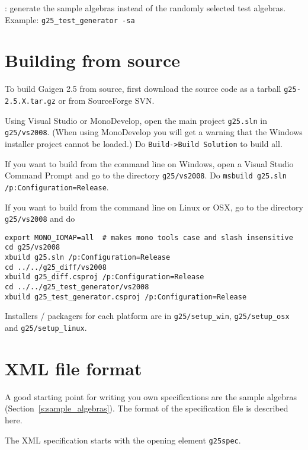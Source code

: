 \documentclass[10pt, a4paper]{article}
\begin{document}
\vspace*{2mm}

: generate the sample algebras instead of the randomly
selected test algebras.
Example: {\tt g25\_test\_generator -sa}

\section{Building from source}

To build Gaigen 2.5 from source, first download the source code as a tarball {\tt g25-2.5.X.tar.gz}
or from SourceForge SVN.

Using Visual Studio or MonoDevelop, open the main project {\tt g25.sln} in {\tt g25/vs2008}.
(When using MonoDevelop you will get a warning that the Windows installer project cannot be loaded.)
Do {\tt Build->Build Solution} to build all. 

If you want to build from the command line on Windows, open a Visual Studio Command Prompt and
go to the directory {\tt g25/vs2008}. Do {\tt msbuild g25.sln /p:Configuration=Release}.

If you want to build from the command line on Linux or OSX, go to the directory {\tt g25/vs2008}
and do 
\begin{verbatim}
export MONO_IOMAP=all  # makes mono tools case and slash insensitive
cd g25/vs2008
xbuild g25.sln /p:Configuration=Release
cd ../../g25_diff/vs2008
xbuild g25_diff.csproj /p:Configuration=Release
cd ../../g25_test_generator/vs2008
xbuild g25_test_generator.csproj /p:Configuration=Release
\end{verbatim}

Installers / packagers for each platform are in {\tt g25/setup\_win}, 
{\tt g25/setup\_osx} and {\tt g25/setup\_linux}.


\section{XML file format}

A good starting point for writing you own specifications are the sample algebras
(Section~\ref{s:sample_algebras}). The format of the specification file is described
here.

The XML specification starts with the opening element {\tt g25spec}.
\end{document}
